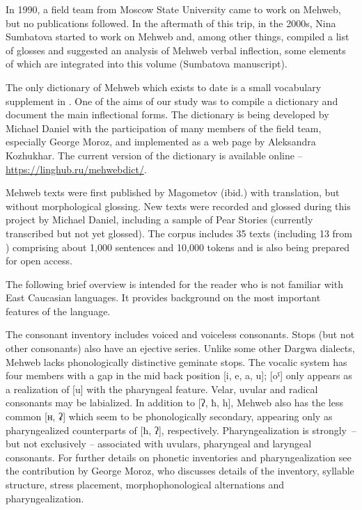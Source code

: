 \begin{refsection}
In 1990, a field team from Moscow State University came to work
on Mehweb, but no publications followed. In the aftermath of this trip,
in the 2000s, Nina Sumbatova started to work on Mehweb and, among other
things, compiled a list of glosses and suggested an analysis of Mehweb verbal
inflection, some elements of which are integrated into this volume
(Sumbatova manuscript).

The only dictionary of Mehweb which exists to date is a small vocabulary
supplement in \citet{magometov1982}. One of the aims of our study was to
compile a dictionary and document the main inflectional forms. The
dictionary is being developed by Michael Daniel with the participation of
many members of the field team, especially George Moroz, and implemented
as a web page by Aleksandra Kozhukhar. The current version of the
dictionary is available online – \url{https://linghub.ru/mehwebdict/}.

Mehweb texts were first published by Magometov (ibid.) with translation,
but without morphological glossing. New texts
were recorded and glossed during this project by Michael Daniel,
including a sample of Pear Stories (currently transcribed but not yet
glossed). The corpus includes 35 texts (including 13 from \citealt{magometov1982})
comprising about 1,000 sentences and 10,000 tokens and is also being
prepared for open access.

The following brief overview is intended for the reader who is not
familiar with East Caucasian languages. It provides background on the most
important features of the language.

The consonant inventory includes voiced and voiceless consonants. Stops
(but not other consonants) also have an ejective series. Unlike some
other Dargwa dialects, Mehweb lacks phonologically distinctive geminate
stops. The vocalic system has four members with a gap in the mid back
position [i, e, a, u]; [oˤ] only appears as a realization of
[u] with the pharyngeal feature. Velar, uvular and radical consonants
may be labialized. In addition to [ʔ, ħ, h], Mehweb also has the less
common [ʜ, ʡ] which seem to be phonologically secondary, appearing
only as pharyngealized counterparts of [ħ, ʔ], respectively.
Pharyngealization is strongly~– but not exclusively – associated with
uvulars, pharyngeal and laryngeal consonants. For further details on
phonetic inventories and pharyngealization see the contribution by
George Moroz, who discusses details of the inventory, syllable
structure, stress placement, morphophonological alternations and
pharyngealization.


\end{refsection}
